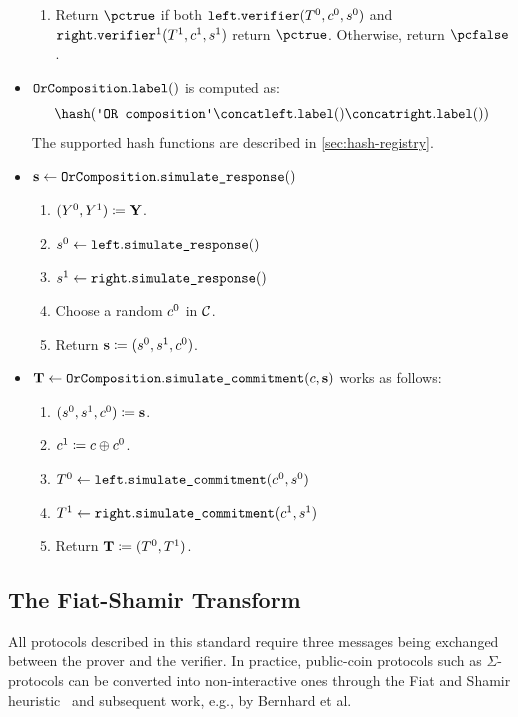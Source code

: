 \documentclass[11pt]{article}
\begin{document}
\begin{itemize}
\begin{enumerate}
      \item
	    Return $\pctrue$ if both $\texttt{left}.\texttt{verifier}(T^0,c^0,s^0)$ and $\texttt{right}.\texttt{verifier}^1(T^1,c^1,s^1)$ return $\pctrue$. Otherwise, return $\pcfalse$.
    \end{enumerate}
  \item  $\texttt{OrComposition}.\texttt{label}()$ is computed as:
    \[
     \hash(\orlabel \concat \leftbranch.\labeltt() \concat \rightbranch.\labeltt())
   \]
   The supported hash functions are described in \cref{sec:hash-registry}.
  \item
  $\mathbf {s} \gets \texttt{OrComposition}.\texttt{simulate\_response}()$
    \begin{enumerate}
      \item
         $(Y^0,Y^1)\coloneqq \mathbf {Y}$.
      \item
         $s^0\gets\texttt{left}.\texttt{simulate\_response}()$
      \item $s^1\gets\texttt{right}.\texttt{simulate\_response}()$
      \item
        Choose a random $c^0$ in $\mathcal{C}$.
			\item
        Return $\mathbf {s} \coloneqq (s^0,s^1,c^0)$.
    \end{enumerate}
\item
$\mathbf {T} \gets \texttt{OrComposition}.\texttt{simulate\_commitment}(c, \mathbf {s})$ works as follows:
\begin{enumerate}
      \item
        $(s^0,s^1,c^0)\coloneqq\mathbf{s}$.
      \item
        $c^1\coloneqq c \oplus c^0$.
      \item
        $T^0 \gets\texttt{left}.\texttt{simulate\_commitment}(c^0,s^0)$
    \item $T^1\gets\texttt{right}.\texttt{simulate\_commitment}(c^1,s^1)$
      \item
        Return $\mathbf {T} \coloneqq (T^0,T^1)$.
    \end{enumerate}
\end{itemize}


\subsection{The Fiat-Shamir Transform}\label{sec:fs}
All protocols described in this standard require three messages being exchanged between the prover and the verifier.
In practice, public-coin protocols such as $\Sigma$-protocols can be converted into non-interactive ones through the
Fiat and Shamir heuristic~\cite{C:FiaSha86} and subsequent work, e.g., by Bernhard et al.~\cite{AC:BerPerWar12}
\end{document}
